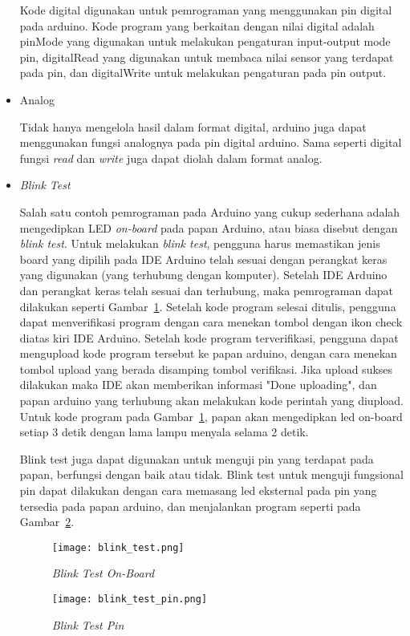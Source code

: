 \begin{itemize}
    Kode digital digunakan untuk pemrograman yang menggunakan pin digital pada arduino. Kode program yang berkaitan dengan nilai digital adalah pinMode yang digunakan untuk melakukan pengaturan input-output mode pin, digitalRead yang digunakan untuk membaca nilai sensor yang terdapat pada pin, dan digitalWrite untuk melakukan pengaturan pada pin output. 
    
    \item Analog
    
    Tidak hanya mengelola hasil dalam format digital, arduino juga dapat menggunakan fungsi analognya pada pin digital arduino. Sama seperti digital fungsi \textit{read} dan \textit{write} juga dapat diolah dalam format analog.
    
    \item \textit{Blink Test}
    
    Salah satu contoh pemrograman pada Arduino yang cukup sederhana adalah mengedipkan LED \textit{on-board} pada papan Arduino, atau biasa disebut dengan \textit{blink test}. Untuk melakukan \textit{blink test}, pengguna harus memastikan jenis board yang dipilih pada IDE Arduino telah sesuai dengan perangkat keras yang digunakan (yang terhubung dengan komputer). Setelah IDE Arduino dan perangkat keras telah sesuai dan terhubung, maka pemrograman dapat dilakukan seperti Gambar~\ref{fig:Blink Test On-Board}. Setelah kode program selesai ditulis, pengguna dapat menverifikasi program dengan cara menekan tombol dengan ikon check diatas kiri IDE Arduino. Setelah kode program terverifikasi, pengguna dapat mengupload kode program tersebut ke papan arduino, dengan cara menekan tombol upload yang berada disamping tombol verifikasi. Jika upload sukses dilakukan maka IDE akan memberikan informasi "Done uploading", dan papan arduino yang terhubung akan melakukan kode perintah yang diupload. Untuk kode program pada Gambar~\ref{fig:Blink Test On-Board}, papan akan mengedipkan led on-board setiap 3 detik dengan lama lampu menyala selama 2 detik. 
    
    Blink test juga dapat digunakan untuk menguji pin yang terdapat pada papan, berfungsi dengan baik atau tidak. Blink test untuk menguji fungsional pin dapat dilakukan dengan cara memasang led eksternal pada pin yang tersedia pada papan arduino, dan menjalankan program seperti pada Gambar~\ref{fig:Blink Test Pin}.
    
        \begin{figure}[H]
        	\centering  
    	\texttt{[image: blink\_test.png]}  
        	\caption[\textit{Blink Test On-Board}]{\textit{Blink Test On-Board}} 
        	\label{fig:Blink Test On-Board} 
        \end{figure}
    
        \begin{figure}[H]
        	\centering  
    	\texttt{[image: blink\_test\_pin.png]}  
        	\caption[\textit{Blink Test Pin}]{\textit{Blink Test Pin}}
        	\label{fig:Blink Test Pin} 
        \end{figure}
    
\end{itemize}



